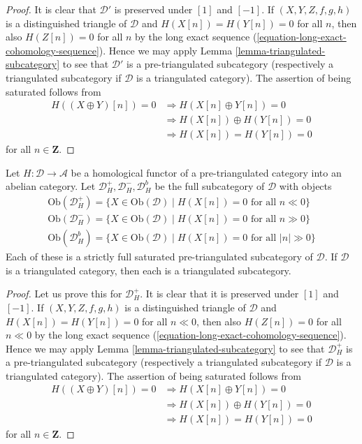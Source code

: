 \begin{proof}
It is clear that $\mathcal{D}'$ is preserved under $[1]$ and $[-1]$.
If $(X, Y, Z, f, g, h)$ is a distinguished triangle of $\mathcal{D}$
and $H(X[n]) = H(Y[n]) = 0$ for all $n$, then also $H(Z[n]) = 0$ for all $n$
by the long exact sequence (\ref{equation-long-exact-cohomology-sequence}).
Hence we may apply
Lemma \ref{lemma-triangulated-subcategory}
to see that $\mathcal{D}'$ is a pre-triangulated subcategory (respectively
a triangulated subcategory if $\mathcal{D}$ is a triangulated category).
The assertion of being saturated follows from
\begin{align*}
H((X \oplus Y)[n]) = 0 & \Rightarrow H(X[n] \oplus Y[n]) = 0 \\
& \Rightarrow H(X[n]) \oplus H(Y[n]) = 0 \\
& \Rightarrow H(X[n]) = H(Y[n]) = 0
\end{align*}
for all $n \in \mathbf{Z}$.
\end{proof}

\begin{lemma}
\label{lemma-homological-functor-bounded}
Let $H : \mathcal{D} \to \mathcal{A}$ be a homological functor of
a pre-triangulated category into an abelian category.
Let $\mathcal{D}_H^{+}, \mathcal{D}_H^{-}, \mathcal{D}_H^b$
be the full subcategory of $\mathcal{D}$ with objects
$$
\begin{matrix}
\text{Ob}(\mathcal{D}_H^{+}) =
\{X \in \text{Ob}(\mathcal{D}) \mid
H(X[n]) = 0\text{ for all }n \ll 0\} \\
\text{Ob}(\mathcal{D}_H^{-}) =
\{X \in \text{Ob}(\mathcal{D}) \mid
H(X[n]) = 0\text{ for all }n \gg 0\} \\
\text{Ob}(\mathcal{D}_H^b) =
\{X \in \text{Ob}(\mathcal{D}) \mid
H(X[n]) = 0\text{ for all }|n| \gg 0\}
\end{matrix}
$$
Each of these is a strictly full saturated pre-triangulated subcategory
of $\mathcal{D}$. If $\mathcal{D}$ is a triangulated category, then
each is a triangulated subcategory.
\end{lemma}

\begin{proof}
Let us prove this for $\mathcal{D}_H^{+}$.
It is clear that it is preserved under $[1]$ and $[-1]$.
If $(X, Y, Z, f, g, h)$ is a distinguished triangle of $\mathcal{D}$
and $H(X[n]) = H(Y[n]) = 0$ for all $n \ll 0$, then also $H(Z[n]) = 0$
for all $n \ll 0$ by the long exact sequence
(\ref{equation-long-exact-cohomology-sequence}).
Hence we may apply
Lemma \ref{lemma-triangulated-subcategory}
to see that $\mathcal{D}_H^{+}$ is a pre-triangulated subcategory
(respectively a triangulated subcategory if $\mathcal{D}$ is a
triangulated category). The assertion of being saturated follows from
\begin{align*}
H((X \oplus Y)[n]) = 0 & \Rightarrow H(X[n] \oplus Y[n]) = 0 \\
& \Rightarrow H(X[n]) \oplus H(Y[n]) = 0 \\
& \Rightarrow H(X[n]) = H(Y[n]) = 0
\end{align*}
for all $n \in \mathbf{Z}$.
\end{proof}

